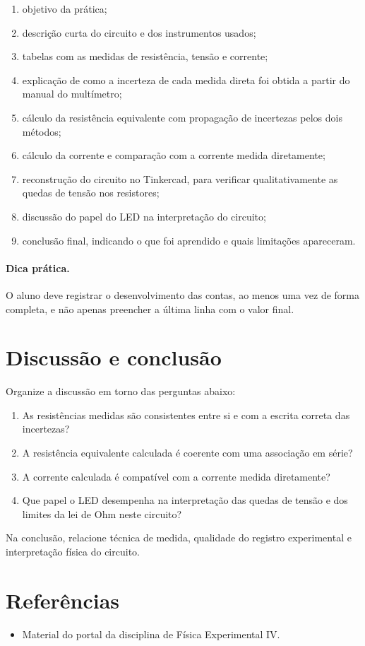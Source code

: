 \documentclass[12pt,a4paper]{article}
\begin{document}
\begin{enumerate}
  \item objetivo da prática;
  \item descrição curta do circuito e dos instrumentos usados;
  \item tabelas com as medidas de resistência, tensão e corrente;
  \item explicação de como a incerteza de cada medida direta foi obtida a partir do manual do multímetro;
  \item cálculo da resistência equivalente com propagação de incertezas pelos dois métodos;
  \item cálculo da corrente e comparação com a corrente medida diretamente;
  \item reconstrução do circuito no Tinkercad, para verificar qualitativamente as quedas de tensão nos resistores;
  \item discussão do papel do LED na interpretação do circuito;
  \item conclusão final, indicando o que foi aprendido e quais limitações apareceram.
\end{enumerate}

\paragraph{Dica prática.}
O aluno deve registrar o desenvolvimento das contas, ao menos uma vez de forma completa, e não apenas preencher a última linha com
o valor final.

\section{Discussão e conclusão}

Organize a discussão em torno das perguntas abaixo:

\begin{enumerate}
  \item As resistências medidas são consistentes entre si e com a escrita correta das incertezas?
  \item A resistência equivalente calculada é coerente com uma associação em série?
  \item A corrente calculada é compatível com a corrente medida diretamente?
  \item Que papel o LED desempenha na interpretação das quedas de tensão e dos limites da lei de Ohm neste circuito?
\end{enumerate}

Na conclusão, relacione técnica de medida, qualidade do registro experimental e interpretação física do circuito.

\section{Referências}

\begin{itemize}
  \item Material do portal da disciplina de Física Experimental IV.
\end{itemize}
\end{document}
